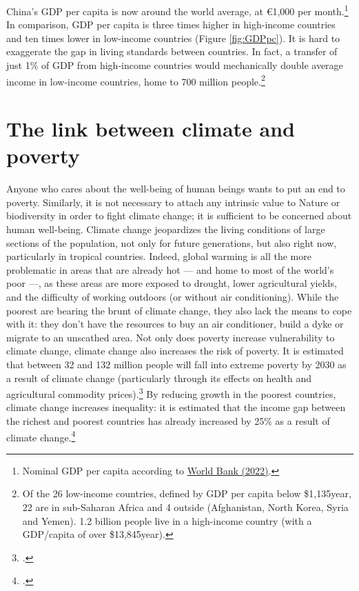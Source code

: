 \documentclass[a5paper,english,openany]{memoir}
\begin{document}
China's GDP per capita is now around the world average, at \euro{}1,000 per month.\footnote{Nominal GDP per capita according to \href{https://data.worldbank.org/indicator/NY.GDP.PCAP.CD?end=2022&locations=CN-1W&start=2015}{World Bank (2022)}.} %
In comparison, GDP per capita is three times higher in high-income countries and ten times lower in low-income countries (Figure \ref{fig:GDPpc}). It is hard to exaggerate the gap in living standards between countries. In fact, a transfer of just 1\% of GDP from high-income countries %
would mechanically double average income in 
low-income countries, home to 700 million people.\footnote{
Of the 26 low-income countries, defined by GDP per capita %
below \$1,135\/year, 22 are in sub-Saharan Africa and 4 outside (Afghanistan, North Korea, Syria and Yemen). 1.2 billion people live in a high-income country (with a GDP/capita of over \$13,845\/year).
} %

\section{The link between climate and poverty} 

Anyone who cares about the well-being of human beings wants to put an end to poverty. 
Similarly, it is not necessary to attach any intrinsic value to Nature or biodiversity in order to fight climate change; it is sufficient to be concerned about human well-being. Climate change jeopardizes the living conditions of large sections of the population, not only for future generations, but also right now, %
particularly in tropical countries. Indeed, global warming is all the more problematic in areas that are already hot --- and home to most of the world's poor ---, as these areas are more exposed to drought, lower agricultural yields, and the difficulty of working outdoors (or without air conditioning). While the poorest are bearing the brunt of climate change, they also lack the means to cope with it: %
they don't have the resources to buy an air conditioner, build a dyke or migrate to an unscathed area. Not only does poverty increase vulnerability to climate change, climate change also increases the risk of poverty. It is estimated that between 32 and 132 million people will fall into extreme poverty by 2030 as a result of climate change (particularly through its effects on health and agricultural commodity prices).\footnote{\citet{jafino_revised_2020}.} By reducing growth in the poorest countries, climate change increases inequality: it is estimated that the income gap between the richest and poorest countries has already increased by 25\% as a result of climate change.\footnote{\cite{diffenbaugh_global_2019,khalfan_climate_2023}.} %
\end{document}
